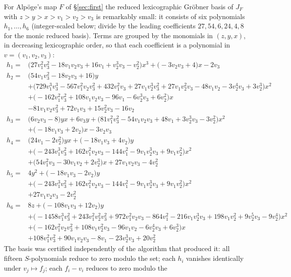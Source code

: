 \documentclass[11pt]{article}
\theoremstyle{plain}
\theoremstyle{definition}
\theoremstyle{remark}
\begin{document}
For Alp\"oge's map $F$ of \S\ref{sec:first} the reduced lexicographic Gr\"obner
basis of $J_F$ with $z>y>x>v_1>v_2>v_3$ is remarkably small: it consists of six
polynomials $h_1,\dots,h_6$ (integer-scaled below; divide by the leading
coefficients $27,54,6,24,4,8$ for the monic reduced basis). Terms are grouped
by the monomials in $(z,y,x)$, in decreasing lexicographic order, so that each
coefficient is a polynomial in $v=(v_1,v_2,v_3)$:
{\small
\begin{align*}
h_1 ={}& \bigl(27v_1^2v_3^2-18v_1v_2v_3+16v_1+v_2^3v_3-v_2^2\bigr)x^3+\bigl(-3v_2v_3+4\bigr)x-2v_3\\[2pt]
h_2 ={}& \bigl(54v_1v_3^2-18v_2v_3+16\bigr)y\\
&+\bigl(729v_1^3v_3^3-567v_1^2v_2v_3^2+432v_1^2v_3+27v_1v_2^3v_3^2+27v_1v_2^2v_3-48v_1v_2-3v_2^4v_3+3v_2^3\bigr)x^2\\
&+\bigl(-162v_1^2v_3^2+108v_1v_2v_3-96v_1-6v_2^3v_3+6v_2^2\bigr)x\\
&-81v_1v_2v_3^2+72v_1v_3+15v_2^2v_3-16v_2\\[2pt]
h_3 ={}& \bigl(6v_2v_3-8\bigr)yx+6v_3y+\bigl(81v_1^2v_3^2-54v_1v_2v_3+48v_1+3v_2^3v_3-3v_2^2\bigr)x^2\\
&+\bigl(-18v_1v_3+2v_2\bigr)x-3v_2v_3\\[2pt]
h_4 ={}& \bigl(24v_1-2v_2^2\bigr)yx+\bigl(-18v_1v_3+4v_2\bigr)y\\
&+\bigl(-243v_1^3v_3^2+162v_1^2v_2v_3-144v_1^2-9v_1v_2^3v_3+9v_1v_2^2\bigr)x^2\\
&+\bigl(54v_1^2v_3-30v_1v_2+2v_2^3\bigr)x+27v_1v_2v_3-4v_2^2\\[2pt]
h_5 ={}& 4y^2+\bigl(-18v_1v_3-2v_2\bigr)y\\
&+\bigl(-243v_1^3v_3^2+162v_1^2v_2v_3-144v_1^2-9v_1v_2^3v_3+9v_1v_2^2\bigr)x^2\\
&+27v_1v_2v_3-2v_2^2\\[2pt]
h_6 ={}& 8z+\bigl(-108v_1v_3+12v_2\bigr)y\\
&+\bigl(-1458v_1^3v_3^2+243v_1^2v_2^2v_3^2+972v_1^2v_2v_3-864v_1^2-216v_1v_2^3v_3+198v_1v_2^2+9v_2^5v_3-9v_2^4\bigr)x^2\\
&+\bigl(-162v_1^2v_2v_3^2+108v_1v_2^2v_3-96v_1v_2-6v_2^4v_3+6v_2^3\bigr)x\\
&+108v_1^2v_3^2+90v_1v_2v_3-8v_1-23v_2^3v_3+20v_2^2
\end{align*}
}
The basis was certified independently of the algorithm that produced it: all
fifteen $S$-polynomials reduce to zero modulo the set; each $h_i$ vanishes
identically under $v_j\mapsto f_j$; each $f_i-v_i$ reduces to zero modulo the
\end{document}
